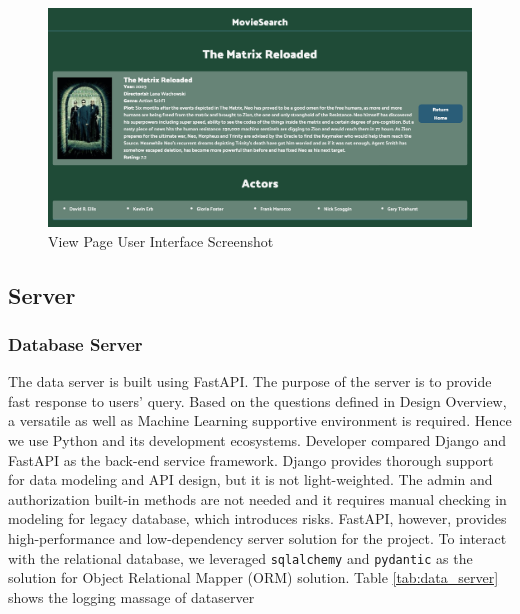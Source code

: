 \documentclass[journal]{IEEEtran}
\theoremstyle{mydefstyle}
\begin{document}
\begin{figure}
    \centering
    \includegraphics[width=1\linewidth]{doc//report//assets/view.png}
    \caption{View Page User Interface Screenshot}
    \label{fig:view}
\end{figure}



\subsection{Server}
\subsubsection{Database Server}
The data server is built using FastAPI. The purpose of the server is to provide fast response to users' query. Based on the questions defined in Design Overview, a versatile as well as Machine Learning supportive environment is required. Hence we use Python and its development ecosystems. Developer compared Django and FastAPI as the back-end service framework. Django provides thorough support for data modeling and API design, but it is not light-weighted. The admin and authorization built-in methods are not needed and it requires manual checking in modeling for legacy database, which introduces risks. FastAPI, however, provides high-performance and low-dependency server solution for the project. To interact with the relational database, we leveraged \texttt{sqlalchemy} and \texttt{pydantic} as the solution for Object Relational Mapper (ORM) solution. Table \ref{tab:data_server} shows the logging massage of dataserver
\end{document}
